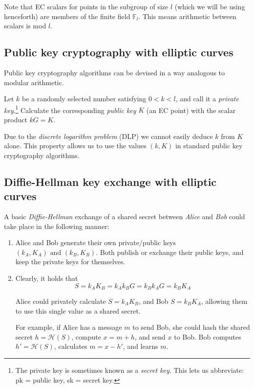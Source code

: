 Note that EC scalars for points in the subgroup of size $l$ (which we will be using henceforth) are members of the finite field $\mathbb{F}_l$. This means arithmetic between scalars is mod $l$.


\subsection{Public key cryptography with elliptic curves}
\label{ec:keys}
Public key cryptography algorithms can be devised in a way analogous to modular arithmetic.

Let \(k\) be a randomly selected number satisfying \(0 < k < l\), and call it a {\em private key}.\footnote{The private key is sometimes known as a {\em secret key}. This lets us abbreviate: pk = public key, sk = secret key.} Calculate the corresponding {\em public key} \(K\) (an EC point) with the scalar product \(k G = K\). 

Due to the {\em discrete logarithm problem} (DLP) we cannot easily deduce \(k\) from \(K\) alone. This property allows us to use the values \((k, K)\) in standard public key cryptography algorithms.


\subsection{Diffie-Hellman key exchange with elliptic curves}
\label{DH_exchange_section}

A basic {\em Diffie-Hellman} \cite{Diffie-Hellman} exchange of a shared secret between {\em Alice} and {\em Bob} could take place in the following manner:

\begin{enumerate}
	\item Alice and Bob generate their own private/public keys \((k_A, K_A) \textrm{ and } (k_B, K_B)\). Both publish or exchange their public keys, and keep the private keys for themselves.

	\item Clearly, it holds that \[S = k_A K_B = k_A k_B G = k_B k_A G = k_B K_A\]

	Alice could privately calculate \(S = k_A K_B\), and Bob \(S = k_B K_A\), allowing them to use this single value as a shared secret.

	For example, if Alice has a message $m$ to send Bob, she could hash the shared secret \(h = \mathcal{H}(S)\), compute $x = m + h$, and send $x$ to Bob. Bob computes $h' = \mathcal{H}(S)$, calculates $m = x - h'$, and learns $m$.
\end{enumerate}   

